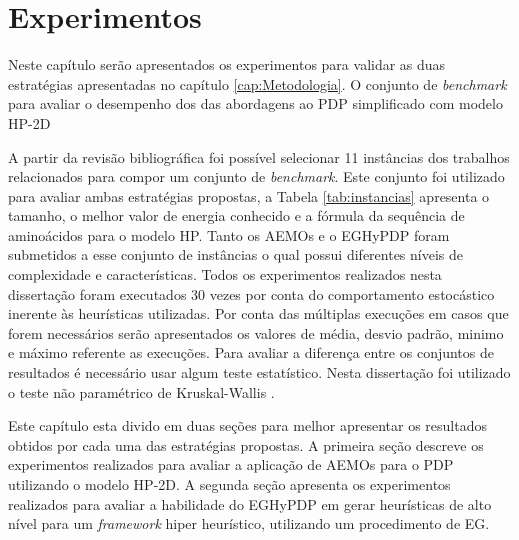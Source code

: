 \chapter{Experimentos}
\label{cap:experimentos}

Neste capítulo serão apresentados  os experimentos para  validar as duas estratégias apresentadas no capítulo \ref{cap:Metodologia}. 
O conjunto de \textit{benchmark} para avaliar o desempenho dos das abordagens ao PDP simplificado com modelo HP-2D


A partir da revisão bibliográfica foi possível selecionar 11 instâncias dos trabalhos relacionados \cite{unger1993genetic,krasnogor2002multimeme,shmygelska2002ant,shmygelska2003improved,hsu2003growth} para compor um conjunto de \textit{benchmark}. Este conjunto foi utilizado para avaliar ambas estratégias propostas, a Tabela \ref{tab:instancias} apresenta o tamanho, o melhor valor de energia conhecido e a fórmula da sequência de aminoácidos para o modelo HP. Tanto os AEMOs e o EGHyPDP foram submetidos a esse conjunto de instâncias o qual possui diferentes níveis de complexidade e características. Todos os experimentos realizados nesta dissertação foram executados 30 vezes por conta do comportamento estocástico inerente às heurísticas utilizadas. Por conta das múltiplas execuções em casos que forem necessários serão apresentados os valores de média, desvio padrão, minimo e máximo referente as execuções. Para avaliar a diferença entre os conjuntos de resultados é necessário usar algum teste estatístico. Nesta dissertação foi utilizado o teste não paramétrico de  Kruskal-Wallis \cite{mckight2010kruskal}.



Este capítulo esta divido em duas seções para melhor apresentar os resultados obtidos por cada uma das estratégias propostas. A primeira seção descreve os experimentos realizados para avaliar a aplicação de AEMOs para o PDP utilizando o modelo HP-2D. A segunda seção apresenta os experimentos realizados para avaliar a habilidade do EGHyPDP em gerar heurísticas de alto nível para um \textit{framework} hiper heurístico, utilizando um procedimento de EG.



